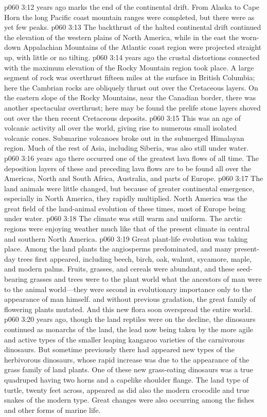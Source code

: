 \pc \vs p060 3:12  years ago marks the end of the continental drift. From Alaska to Cape Horn the long Pacific coast mountain ranges were completed, but there were as yet few peaks.
\vs p060 3:13 The backthrust of the halted continental drift continued the elevation of the western plains of North America, while in the east the worn\hyp{}down Appalachian Mountains of the Atlantic coast region were projected straight up, with little or no tilting.
\pc \vs p060 3:14  years ago the crustal distortions connected with the maximum elevation of the Rocky Mountain region took place. A large segment of rock was overthrust fifteen miles at the surface in British Columbia; here the Cambrian rocks are obliquely thrust out over the Cretaceous layers. On the eastern slope of the Rocky Mountains, near the Canadian border, there was another spectacular overthrust; here may be found the prelife stone layers shoved out over the then recent Cretaceous deposits.
\vs p060 3:15 This was an age of volcanic activity all over the world, giving rise to numerous small isolated volcanic cones. Submarine volcanoes broke out in the submerged Himalayan region. Much of the rest of Asia, including Siberia, was also still under water.
\pc \vs p060 3:16  years ago there occurred one of the greatest lava flows of all time. The deposition layers of these and preceding lava flows are to be found all over the Americas, North and South Africa, Australia, and parts of Europe.
\vs p060 3:17 The land animals were little changed, but because of greater continental emergence, especially in North America, they rapidly multiplied. North America was the great field of the land\hyp{}animal evolution of these times, most of Europe being under water.
\vs p060 3:18 The climate was still warm and uniform. The arctic regions were enjoying weather much like that of the present climate in central and southern North America.
\vs p060 3:19 Great plant\hyp{}life evolution was taking place. Among the land plants the angiosperms predominated, and many present\hyp{}day trees first appeared, including beech, birch, oak, walnut, sycamore, maple, and modern palms. Fruits, grasses, and cereals were abundant, and these seed\hyp{}bearing grasses and trees were to the plant world what the ancestors of man were to the animal world---they were second in evolutionary importance only to the appearance of man himself.  and without previous gradation, the great family of flowering plants mutated. And this new flora soon overspread the entire world.
\pc \vs p060 3:20  years ago, though the land reptiles were on the decline, the dinosaurs continued as monarchs of the land, the lead now being taken by the more agile and active types of the smaller leaping kangaroo varieties of the carnivorous dinosaurs. But sometime previously there had appeared new types of the herbivorous dinosaurs, whose rapid increase was due to the appearance of the grass family of land plants. One of these new grass\hyp{}eating dinosaurs was a true quadruped having two horns and a capelike shoulder flange. The land type of turtle, twenty feet across, appeared as did also the modern crocodile and true snakes of the modern type. Great changes were also occurring among the fishes and other forms of marine life.
